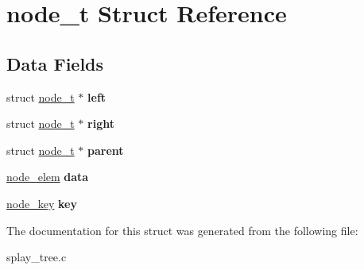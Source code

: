\hypertarget{structnode__t}{}\section{node\+\_\+t Struct Reference}
\label{structnode__t}
\subsection*{Data Fields}
\begin{DoxyCompactItemize}
\item 
\hypertarget{structnode__t_ae3ce583073f3fd0a7cfd4ec3d6914537}{}struct \hyperlink{structnode__t}{node\+\_\+t} $\ast$ {\bfseries left}\label{structnode__t_ae3ce583073f3fd0a7cfd4ec3d6914537}

\item 
\hypertarget{structnode__t_a88ddc7d90adda8cc75b1e45dd5a58258}{}struct \hyperlink{structnode__t}{node\+\_\+t} $\ast$ {\bfseries right}\label{structnode__t_a88ddc7d90adda8cc75b1e45dd5a58258}

\item 
\hypertarget{structnode__t_ab129d4876b839cd51f0603a367d48b65}{}struct \hyperlink{structnode__t}{node\+\_\+t} $\ast$ {\bfseries parent}\label{structnode__t_ab129d4876b839cd51f0603a367d48b65}

\item 
\hypertarget{structnode__t_a38d892c5472f7bfa3246ceb3ddda7732}{}\hyperlink{splay__tree_8h_a63ae18d1e62ef66f2b7e5e76cd04a27f}{node\+\_\+elem} {\bfseries data}\label{structnode__t_a38d892c5472f7bfa3246ceb3ddda7732}

\item 
\hypertarget{structnode__t_a0a0db3ac2d60fc34a711ead8d0227779}{}\hyperlink{splay__tree_8h_adcfee39dc0f7f5e13313c7413093d98b}{node\+\_\+key} {\bfseries key}\label{structnode__t_a0a0db3ac2d60fc34a711ead8d0227779}

\end{DoxyCompactItemize}


The documentation for this struct was generated from the following file\+:\begin{DoxyCompactItemize}
\item 
splay\+\_\+tree.\+c\end{DoxyCompactItemize}
